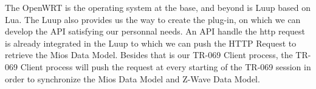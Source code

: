 The OpenWRT is the operating system at the base, and beyond is Luup based on Lua. The Luup also provides us the way to create the plug-in, on which we can develop the API satisfying our personnal needs. An API handle the http request is already integrated in the Luup to which we can push the HTTP Request to retrieve the Mios Data Model. Besides that is our TR-069 Client process, the TR-069 Client process will push the request at every starting of the TR-069 session in order to synchronize the Mios Data Model and Z-Wave Data Model.
